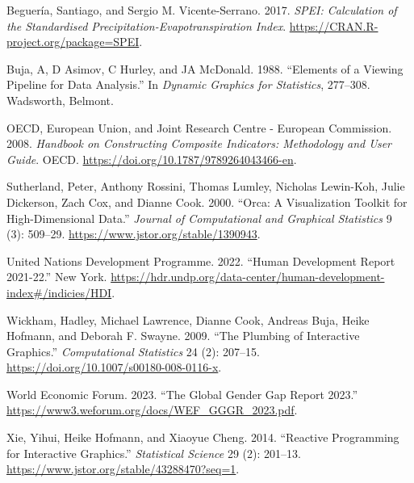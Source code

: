 \documentclass[
]{interact}
\newlength{\cslhangindent}
\newlength{\cslentryspacingunit} %
\newenvironment{CSLReferences}[2] %
 {%
  \setlength{\parindent}{0pt}
  \ifodd #1
  \let\oldpar\par
  \def\par{\hangindent=\cslhangindent\oldpar}
  \fi
  \setlength{\parskip}{#2\cslentryspacingunit}
 }%
 {}
\begin{document}
\hypertarget{refs}{}
\begin{CSLReferences}{1}{0}
\leavevmode{}%
Beguería, Santiago, and Sergio M. Vicente-Serrano. 2017. \emph{SPEI:
Calculation of the Standardised Precipitation-Evapotranspiration Index}.
\url{https://CRAN.R-project.org/package=SPEI}.

\leavevmode{}%
Buja, A, D Asimov, C Hurley, and JA McDonald. 1988. {``Elements of a
Viewing Pipeline for Data Analysis.''} In \emph{Dynamic Graphics for
Statistics}, 277--308. Wadsworth, Belmont.

\leavevmode{}%
OECD, European Union, and Joint Research Centre - European Commission.
2008. \emph{Handbook on {Constructing} {Composite} {Indicators}:
{Methodology} and {User} {Guide}}. OECD.
\url{https://doi.org/10.1787/9789264043466-en}.

\leavevmode{}%
Sutherland, Peter, Anthony Rossini, Thomas Lumley, Nicholas Lewin-Koh,
Julie Dickerson, Zach Cox, and Dianne Cook. 2000. {``Orca: {A}
{Visualization} {Toolkit} for {High}-{Dimensional} {Data}.''}
\emph{Journal of Computational and Graphical Statistics} 9 (3): 509--29.
\url{https://www.jstor.org/stable/1390943}.

\leavevmode{}%
United Nations Development Programme. 2022. {``Human Development Report
2021-22.''} New York.
\url{https://hdr.undp.org/data-center/human-development-index\#/indicies/HDI}.

\leavevmode{}%
Wickham, Hadley, Michael Lawrence, Dianne Cook, Andreas Buja, Heike
Hofmann, and Deborah F. Swayne. 2009. {``The Plumbing of Interactive
Graphics.''} \emph{Computational Statistics} 24 (2): 207--15.
\url{https://doi.org/10.1007/s00180-008-0116-x}.

\leavevmode{}%
World Economic Forum. 2023. {``{The Global Gender Gap Report 2023}.''}
\url{https://www3.weforum.org/docs/WEF_GGGR_2023.pdf}.

\leavevmode{}%
Xie, Yihui, Heike Hofmann, and Xiaoyue Cheng. 2014. {``Reactive
{Programming} for {Interactive} {Graphics}.''} \emph{Statistical
Science} 29 (2): 201--13.
\url{https://www.jstor.org/stable/43288470?seq=1}.

\end{CSLReferences}
\end{document}
